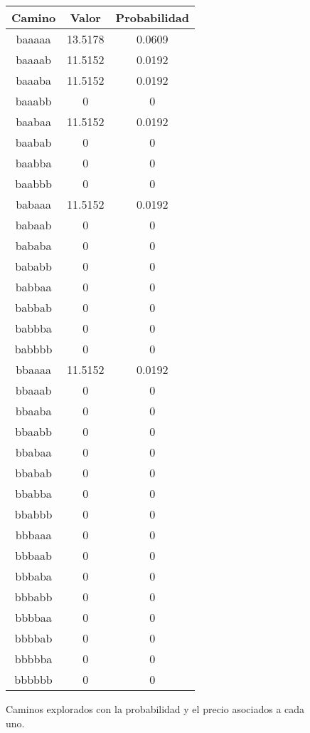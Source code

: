 \begin{figure}[hbpt]
\begin{minipage}{0.48\textwidth}
\begin{center}
\begin{tabular}{|c|c|c|}
\hline
\end{tabular}
\end{center}
\end{minipage}
\begin{minipage}{0.48\textwidth}
\begin{center}
\begin{tabular}{|c|c|c|}
\hline
\textbf{Camino} & \textbf{Valor} & \textbf{Probabilidad} \\
\hline
baaaaa  &  13.5178  &  0.0609  \\
baaaab  &  11.5152  &  0.0192  \\
baaaba  &  11.5152  &  0.0192  \\
baaabb  & 0 & 0 \\
baabaa  &  11.5152  &  0.0192  \\
baabab  & 0 & 0 \\
baabba  & 0 & 0 \\
baabbb  & 0 & 0 \\
babaaa  &  11.5152  &  0.0192  \\
babaab  & 0 & 0 \\
bababa  & 0 & 0 \\
bababb  & 0 & 0 \\
babbaa  & 0 & 0 \\
babbab  & 0 & 0 \\
babbba  & 0 & 0 \\
babbbb  & 0 & 0 \\
bbaaaa  &  11.5152  &  0.0192  \\
bbaaab  & 0 & 0 \\
bbaaba  & 0 & 0 \\
bbaabb  & 0 & 0 \\
bbabaa  & 0 & 0 \\
bbabab  & 0 & 0 \\
bbabba  & 0 & 0 \\
bbabbb  & 0 & 0 \\
bbbaaa  & 0 & 0 \\
bbbaab  & 0 & 0 \\
bbbaba  & 0 & 0 \\
bbbabb  & 0 & 0 \\
bbbbaa  & 0 & 0 \\
bbbbab  & 0 & 0 \\
bbbbba  & 0 & 0 \\
bbbbbb  & 0 & 0 \\
\hline
\end{tabular}
\end{center}
\end{minipage}
\caption{Caminos explorados con la probabilidad y el precio asociados a cada uno.}
\label{fig:2_4b}
\end{figure}